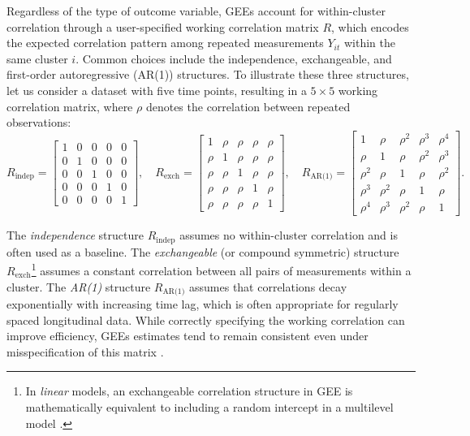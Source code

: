 \documentclass[stu]{apa7}
\begin{document}
Regardless of the type of outcome variable, GEEs account for within-cluster correlation through a user-specified working correlation matrix \( R \), which encodes the expected correlation pattern among repeated measurements $Y_{it}$ within the same cluster $i$. Common choices include the independence, exchangeable, and first-order autoregressive (AR(1)) structures. To illustrate these three structures, let us consider a dataset with five time points, resulting in a $5 \times 5$ working correlation matrix, where $\rho$ denotes the correlation between repeated observations:
\[
R_\text{indep} = 
\begin{bmatrix}
1 & 0 & 0 & 0 & 0 \\
0 & 1 & 0 & 0 & 0 \\
0 & 0 & 1 & 0 & 0 \\
0 & 0 & 0 & 1 & 0 \\
0 & 0 & 0 & 0 & 1
\end{bmatrix}, \quad R_\text{exch} = 
\begin{bmatrix}
1 & \rho & \rho & \rho & \rho \\
\rho & 1 & \rho & \rho & \rho \\
\rho & \rho & 1 & \rho & \rho \\
\rho & \rho & \rho & 1 & \rho \\
\rho & \rho & \rho & \rho & 1
\end{bmatrix}, \quad R_\text{AR(1)} = 
\begin{bmatrix}
1 & \rho & \rho^2 & \rho^3 & \rho^4 \\
\rho & 1 & \rho & \rho^2 & \rho^3 \\
\rho^2 & \rho & 1 & \rho & \rho^2 \\
\rho^3 & \rho^2 & \rho & 1 & \rho \\
\rho^4 & \rho^3 & \rho^2 & \rho & 1
\end{bmatrix}.
\]

The \textit{independence} structure $R_\text{indep}$ assumes no within-cluster correlation and is often used as a baseline. The \textit{exchangeable} (or compound symmetric)  structure $R_\text{exch}$\footnote{In \textit{linear} models, an exchangeable correlation structure in GEE is mathematically equivalent to including a random intercept in a multilevel model \parencite[e.g.,][]{gardiner_fixed_2009, koper_generalized_2009}.} assumes a constant correlation between all pairs of measurements within a cluster. The \textit{AR(1)} structure $R_\text{AR(1)}$ assumes that correlations decay exponentially with increasing time lag, which is often appropriate for regularly spaced longitudinal data. While correctly specifying the working correlation can improve efficiency, GEEs estimates tend to remain consistent even under misspecification of this matrix \parencite{zeger_models_1988, ballinger_using_2004}.
\end{document}
